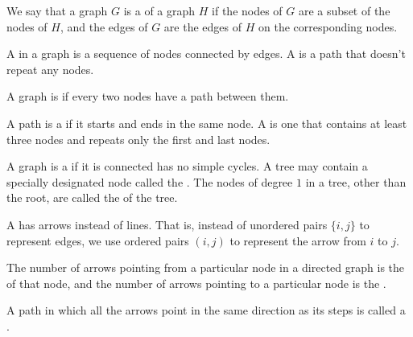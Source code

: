 \documentclass[12pt, a4paper, oneside, openright, titlepage]{book}
\begin{document}
\begin{appendices}
        \begin{defn}
            We say that a graph $G$ is a  of a graph $H$ if the nodes of $G$ are a subset of the nodes of $H$, and the edges of $G$ are the edges of $H$ on the corresponding nodes.
        \end{defn}

        \begin{defn}
            A  in a graph is a sequence of nodes connected by edges. A  is a path that doesn't repeat any nodes.
        \end{defn}

        \begin{defn}
            A graph is  if every two nodes have a path between them.
        \end{defn}

        \begin{defn}
            A path is a  if it starts and ends in the same node. A  is one that contains at least three nodes and repeats only the first and last nodes.
        \end{defn}

    
        \begin{defn}
            A graph is a  if it is connected has no simple cycles. A tree may contain a specially designated node called the . The nodes of degree $1$ in a tree, other than the root, are called the  of the tree.
        \end{defn}

        \begin{defn}
            A  has arrows instead of lines. That is, instead of unordered pairs $\{i,j\}$ to represent edges, we use ordered pairs $(i,j)$ to represent the arrow from $i$ to $j$.
        \end{defn}

        \begin{defn}
            The number of arrows pointing from a particular node in a directed graph is the  of that node, and the number of arrows pointing to a particular node is the .
        \end{defn}

        \begin{defn}
            A path in which all the arrows point in the same direction as its steps is called a . 
        \end{defn}



\end{appendices}
\end{document}
